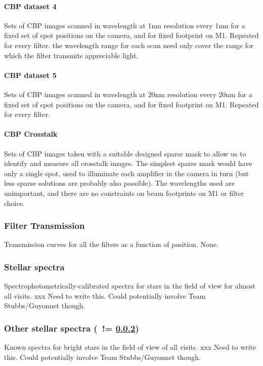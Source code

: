 \paragraph{CBP dataset 4}\label{inputs:CBP:filter}
Sets of CBP images scanned in wavelength at 1nm resolution every 1nm for a fixed set of spot positions on the camera, and for fixed footprint on M1.  Repeated for every filter. \Nb the wavelength range for each scan need only cover the range for which the filter transmits appreciable light.


\paragraph{CBP dataset 5}\label{inputs:CBP:leak}
Sets of CBP images scanned in wavelength at 20nm resolution every 20nm for a fixed set of spot positions on the camera, and for fixed footprint on M1. Repeated for every filter.


\paragraph {CBP Crosstalk}\label{inputs:CBP:crosstalk}
Sets of CBP images taken with a suitable designed sparse mask to allow us to identify and measure all crosstalk images.  The simplest sparse mask would have only a single spot, used to illuminate each amplifier in the camera in turn (but less sparse solutions are probably also possible).  The wavelengths used are unimportant, and there are no constraints on beam footprints on M1 or filter choice.


\subsubsection{Filter Transmission}\label{inputs:filterTransmission}
\cameraTeam
Transmission curves for all the filters as a function of position.
\alg None.


\subsubsection{Stellar spectra}\label{inputs:starSpectrum} 
Spectrophotometrically-calibrated spectra for stars in the field of view for almost all visits.
\alg xxx Need to write this. Could potentially involve Team Stubbs/Guyonnet though.


\subsubsection{Other stellar spectra (\nb~!= \ref{inputs:starSpectrum})}\label{inputs:standardStarSpectrum}
Known spectra for bright stars in the field of view of all visits.
\alg xxx Need to write this. Could potentially involve Team Stubbs/Guyonnet though.


